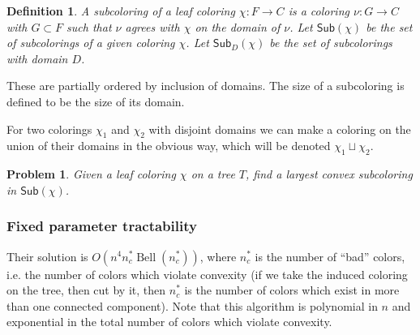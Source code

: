 \documentclass{amsart}
\newcommand{\col}{\chi}
\newcommand{\subcolS}{\mathsf{Sub}}
\newcommand{\Bell}{\operatorname{Bell}}
\newcommand{\nbadcolors}{n_c^*}
\newtheorem{prop}{Proposition}
\newtheorem{problem}{Problem}
\newtheorem{defn}{Definition}
\begin{document}
\begin{defn}
  A subcoloring of a leaf coloring $\chi: F \rightarrow C$ is a coloring $\nu: G \rightarrow C$ with $G \subset F$ such that $\nu$ agrees with $\col$ on the domain of $\nu$.
  Let $\subcolS(\col)$ be the set of subcolorings of a given coloring $\col$.
  Let $\subcolS_D(\col)$ be the set of subcolorings with domain $D$.
\end{defn}
These are partially ordered by inclusion of domains.
The size of a subcoloring is defined to be the size of its domain.

For two colorings $\col_1$ and $\col_2$ with disjoint domains we can make a coloring on the union of their domains in the obvious way, which will be denoted $\col_1 \sqcup \col_2$.

\begin{problem}
\label{prob:subcolor}
  Given a leaf coloring $\col$ on a tree $T$, find a largest convex subcoloring in $\subcolS(\col)$.
\end{problem}

%
%

\subsubsection{Fixed parameter tractability}
Their solution is $O(n^4 \nbadcolors \Bell(\nbadcolors))$, where $\nbadcolors$ is the number of ``bad'' colors, i.e. the number of colors which violate convexity (if we take the induced coloring on the tree, then cut by it, then $\nbadcolors$ is the number of colors which exist in more than one connected component).
Note that this algorithm is polynomial in $n$ and exponential in the total number of colors which violate convexity.
\end{document}
